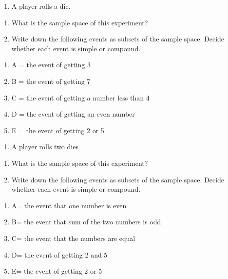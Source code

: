 \documentclass[]{book}
\providecommand{\tightlist}{%
  \setlength{\itemsep}{0pt}\setlength{\parskip}{0pt}}
\begin{document}
\begin{enumerate}
\def\labelenumi{\arabic{enumi}.}
\setcounter{enumi}{3}
\tightlist
\item
  A player rolls a die.
\end{enumerate}

\begin{enumerate}
\def\labelenumi{(\alph{enumi})}
\tightlist
\item
  What is the sample space of this experiment?
\item
  Write down the following events as subsets of the sample space. Decide whether each event is simple or compound.
\end{enumerate}

\begin{enumerate}
\def\labelenumi{\roman{enumi}.}
\tightlist
\item
  A = the event of getting 3
\item
  B = the event of getting 7
\item
  C = the event of getting a number less than 4
\item
  D = the event of getting an even number
\item
  E = the event of getting 2 or 5
\end{enumerate}

\begin{enumerate}
\def\labelenumi{\arabic{enumi}.}
\setcounter{enumi}{4}
\tightlist
\item
  A player rolls two dies
\end{enumerate}

\begin{enumerate}
\def\labelenumi{(\alph{enumi})}
\tightlist
\item
  What is the sample space of this experiment?
\item
  Write down the following events as subsets of the sample space. Decide whether each event is simple or compound.
\end{enumerate}

\begin{enumerate}
\def\labelenumi{\roman{enumi}.}
\tightlist
\item
  A= the event that one number is even
\item
  B= the event that sum of the two numbers is odd
\item
  C= the event that the numbers are equal
\item
  D= the event of getting 2 and 5
\item
  E= the event of getting 2 or 5
\end{enumerate}
\end{document}
